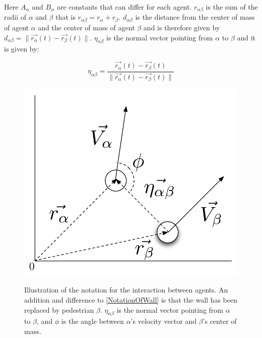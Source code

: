 \begin{itemize}
Here $A_{\alpha}$ and $B_{\alpha}$ are constants that can differ for each agent. 
$r_{\alpha \beta}$ is the sum of the radii of $\alpha$ and $\beta$ that is 
$r_{\alpha \beta} = r_{\alpha} + r_{\beta}$. $d_{\alpha \beta}$ is the 
distance from the center of mass of agent $\alpha$ and the center of mass of 
agent $\beta$ and is therefore given by $d_{\alpha \beta} = 
\|\vec{r_{\alpha}}\left( t \right) - \vec{r_{\beta}}\left( t \right) \|$.
$\eta_{\alpha \beta}$ is the normal vector pointing from $\alpha$ to $\beta$ 
and it is given by:

\begin{equation}
    \eta_{\alpha \beta} =
        \frac{\vec{r_{\alpha}}(t) - \vec{r_{\beta}}(t)}
             {\|\vec{r_{\alpha}}(t) - \vec{r_{\beta}}(t) \|}
\end{equation}

\begin{figure}[ht]
    \centering
    {\includegraphics[scale=0.35]{Figures/NotationOfInteraction.pdf}} 
    \caption[Notation of the interaction between two agents]{Illustration of the notation for the interaction between agents.
	     An addition and difference to \ref{NotationOfWall} is that the wall has been replaced by pedestrian $\beta$.
	     $\eta_{\alpha \beta}$ is the normal vector pointing from $\alpha$ to $\beta$, and $\phi$ is the angle between $\alpha$'s 
	     velocity vector and $\beta$'s center of mass.}
    \label{fig:NotationOfInteraction}
\end{figure}



\end{itemize}
